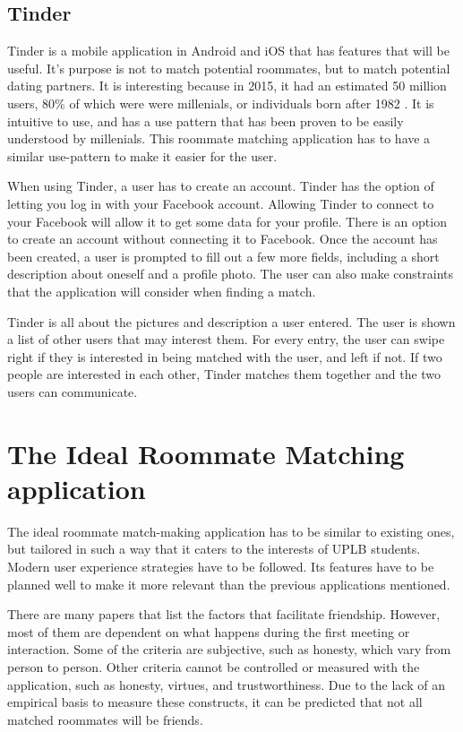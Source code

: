 \documentclass[journal]{./IEEE/IEEEtran}
\begin{document}
\subsection{Tinder}
Tinder is a mobile application in Android and iOS that has features that will be useful. It's purpose is not to match potential roommates, but to match potential dating partners. It is interesting because in 2015, it had an estimated 50 million users\cite{tinderstat2}, 80\% of which were were millenials, or individuals born after 1982 \cite{tinderstat}\cite{millenial}. It is intuitive to use, and has a use pattern that has been proven to be easily understood by millenials. This roommate matching application has to have a similar use-pattern to make it easier for the user.

When using Tinder, a user has to create an account. Tinder has the option of letting you log in with your Facebook account. Allowing Tinder to connect to your Facebook will allow it to get some data for your profile. There is an option to create an account without connecting it to Facebook. Once the account has been created, a user is prompted to fill out a few more fields, including a short description about oneself and a profile photo. The user can also make constraints that the application will consider when finding a match.

Tinder is all about the pictures and description a user entered. The user is shown a list of other users that may interest them. For every entry, the user can swipe right if they is interested in being matched with the user, and left if not. If two people are interested in each other, Tinder matches them together and the two users can communicate.

\section{The Ideal Roommate Matching application}
The ideal roommate match-making application has to be similar to existing ones, but tailored in such a way that it caters to the interests of UPLB students. Modern user experience strategies have to be followed. Its features have to be planned well to make it more relevant than the previous applications mentioned.

There are many papers that list the factors that facilitate friendship. However, most of them are dependent on what happens during the first meeting or interaction. Some of the criteria are subjective, such as honesty, which  vary from person to person. Other criteria cannot be controlled or measured with the application, such as honesty, virtues, and trustworthiness. Due to the lack of an empirical basis to measure these constructs, it can be predicted that not all matched roommates will be friends.
\end{document}
